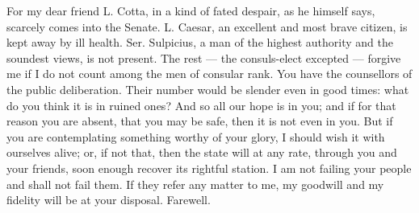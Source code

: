  For my dear friend L. Cotta, in a kind of fated despair, as he himself says, scarcely comes into the Senate. L. Caesar, an excellent and most brave citizen, is kept away by ill health. Ser. Sulpicius, a man of the highest authority and the soundest views, is not present. The rest --- the consuls-elect excepted --- forgive me if I do not count among the men of consular rank. You have the counsellors of the public deliberation. Their number would be slender even in good times: what do you think it is in ruined ones? And so all our hope is in you; and if for that reason you are absent, that you may be safe, then it is not even in you. But if you are contemplating something worthy of your glory, I should wish it with ourselves alive; or, if not that, then the state will at any rate, through you and your friends, soon enough recover its rightful station. I am not failing your people and shall not fail them. If they refer any matter to me, my goodwill and my fidelity will be at your disposal. Farewell.
